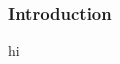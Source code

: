 \documentclass{beamer}
\begin{document}
\begin{frame}
\frametitle{Introduction}
hi


\end{frame}
\end{document}
